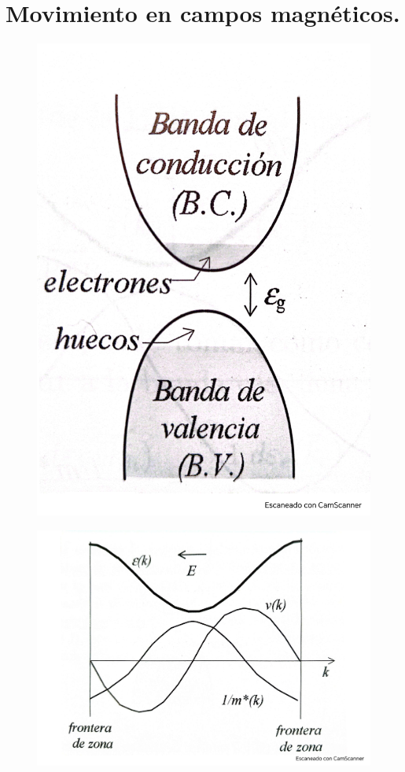\section{Movimiento en campos magnéticos.}

\begin{figure}[h!] \centering
	\includegraphics[scale=0.5]{Cuerpo/Ch_08/Fotos libro 1.pdf}
	\caption{}
	\label{Fig:08-01}
\end{figure}
\begin{figure}[h!] \centering
	\includegraphics[scale=0.5]{Cuerpo/Ch_08/Fotos libro 2.pdf}
	\caption{}
	\label{Fig:08-02}
\end{figure}
